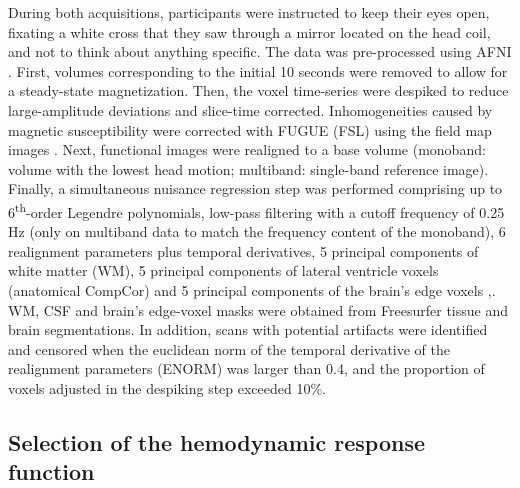 During both acquisitions, participants were instructed to keep their eyes open,
fixating a white cross that they saw through a mirror located on the head coil,
and not to think about anything specific. The data was pre-processed using AFNI
\citep{Cox1996AFNISoftwareAnalysis}. First, volumes corresponding to the initial
10 seconds were removed to allow for a steady-state magnetization. Then, the
voxel time-series were despiked to reduce large-amplitude deviations and
slice-time corrected. Inhomogeneities caused by magnetic susceptibility were
corrected with FUGUE (FSL) using the field map images \citep{Jenkinson2012FSL}.
Next, functional images were realigned to a base volume (monoband: volume with
the lowest head motion; multiband: single-band reference image). Finally, a
simultaneous nuisance regression step was performed comprising up to
6\textsuperscript{th}-order Legendre polynomials, low-pass filtering with a
cutoff frequency of 0.25 Hz (only on multiband data to match the frequency
content of the monoband), 6 realignment parameters plus temporal derivatives, 5
principal components of white matter (WM), 5 principal components of lateral
ventricle voxels (anatomical CompCor) \citep{Behzadi_2007} and 5 principal
components of the brain's edge voxels ,\citep{Patriat_2015}. WM, CSF and brain's
edge-voxel masks were obtained from Freesurfer tissue and brain segmentations.
In addition, scans with potential artifacts were identified and censored when
the euclidean norm of the temporal derivative of the realignment parameters
(ENORM) was larger than 0.4, and the proportion of voxels adjusted in the
despiking step exceeded 10\%.

\subsection{Selection of the hemodynamic response function}

